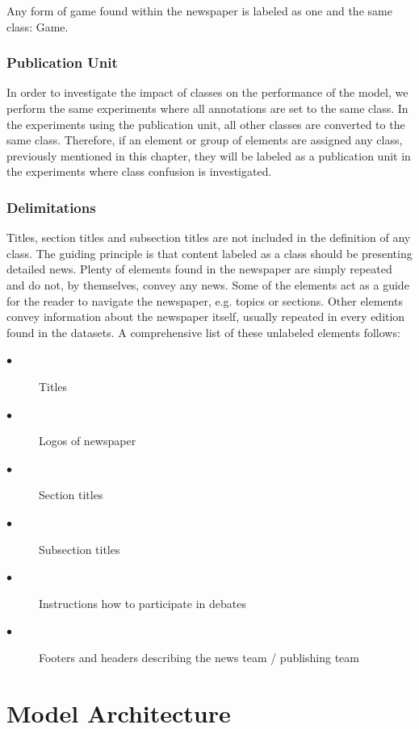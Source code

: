 \documentclass[english, bibtex]{kththesis}
\begin{document}
Any form of game found within the newspaper is labeled as one and the same class: Game.  

\subsection{Publication Unit}

In order to investigate the impact of classes on the performance of the model, we perform the same experiments where all annotations are set to the same class. In the experiments using the publication unit, all other classes are converted to the same class. Therefore, if an element or group of elements are assigned any class, previously mentioned in this chapter, they will be labeled as a publication unit in the experiments where class confusion is investigated.

\subsection{Delimitations}

Titles, section titles and subsection titles are not included in the definition of any class. The guiding principle is that content labeled as a class should be presenting detailed news. Plenty of elements found in the newspaper are simply repeated and do not, by themselves, convey any news. Some of the elements act as a guide for the reader to navigate the newspaper, e.g. topics or sections. Other elements convey information about the newspaper itself, usually repeated in every edition found in the datasets. A comprehensive list of these unlabeled elements follows:

\begin{description}
\item[$\bullet$] Titles
\item[$\bullet$] Logos of newspaper
\item[$\bullet$] Section titles
\item[$\bullet$] Subsection titles
\item[$\bullet$] Instructions how to participate in debates
\item[$\bullet$] Footers and headers describing the news team / publishing team
\end{description}


\cleardoublepage

\chapter{Model Architecture}
\label{ch:modelarch}
\end{document}
